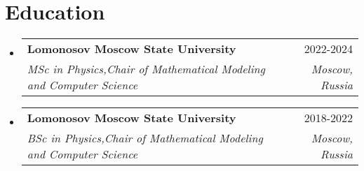 \documentclass[a4paper,11pt]{article}
\makeatletter
\newcommand{\resumeItem}[1]{
  \item\small{#1}
}
\newcommand{\resumeItemListStart}{\begin{itemize}[rightmargin=0.11in]}
\newcommand{\resumeItemListEnd}{\end{itemize}}
\newcommand{\resumeQuadHeading}[4]{
  \item
  \begin{tabular*}{0.96\textwidth}[t]{l@{\extracolsep{\fill}}r}
    \textbf{#1} & #2 \\
    \textit{\small#3} & \textit{\small #4} \\
  \end{tabular*}
}
\newcommand{\resumeQuadHeadingChild}[2]{
  \item
  \begin{tabular*}{0.96\textwidth}[t]{l@{\extracolsep{\fill}}r}
    \textbf{\small#1} & {\small#2} \\
  \end{tabular*}
}
\newcommand{\resumeHeadingListStart}{
  \begin{itemize}[leftmargin=0.15in, label={}]
}
\newcommand{\resumeHeadingListEnd}{\end{itemize}}
\makeatother
\begin{document}





\section{Education}
  \resumeHeadingListStart{}
  
    \resumeQuadHeading{Lomonosov Moscow State University}{2022-2024}
    {MSc in Physics,Chair of Mathematical Modeling and Computer Science}{Moscow, Russia}

    \resumeQuadHeading{Lomonosov Moscow State University}{2018-2022}
    {BSc in Physics,Chair of Mathematical Modeling and Computer Science}{Moscow, Russia}

  \resumeHeadingListEnd{}


\end{document}
